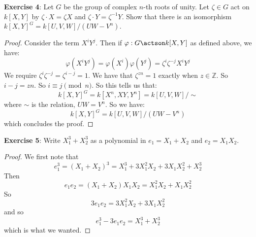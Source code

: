 \documentclass{article}
\begin{document}
\textbf{Exercise 4}: Let $G$ be the group of complex $n$-th roots of unity. Let $\zeta \in G$ act on $k[X, Y]$ by $\zeta \cdot X = \zeta X$ and $\zeta \cdot Y = \zeta^{-1}Y$. Show that there is an isomorphism $k[X, Y]^{G} = k[U, V, W]/(UW - V^{n})$.
    \begin{proof}
        Consider the term $X^{i}Y^{j}$. Then if $\varphi: G \actson k[X, Y]$ as defined above, we have:
            \begin{equation*}
                \varphi(X^{i}Y^{j}) = \varphi(X^{i})\varphi(Y^{j}) = \zeta^{i}\zeta^{-j}X^{i}Y^{j}
            \end{equation*}
        We require $\zeta^{i}\zeta^{-j} = \zeta^{i - j} = 1$. We have that $\zeta^{zn} = 1$ exactly when $z \in \mathbb{Z}$. So $i - j = zn$. So $i \equiv j \pmod{n}$. So this tells us that:
            \begin{equation*}
                k[X, Y]^{G} = k[X^{n}, XY, Y^{n}] = k[U, V, W]/\sim 
            \end{equation*}
        where $\sim $ is the relation, $UW = V^{n}$. So we have:
            \begin{equation*}
                k[X, Y]^{G} = k[U, V, W]/(UW - V^{n})
            \end{equation*}
        which concludes the proof.
    \end{proof}

\textbf{Exercise 5}: Write $X_{1}^{3} + X_{2}^{3}$ as a polynomial in $e_{1} = X_{1} + X_{2}$ and $e_{2} = X_{1}X_{2}$.
    \begin{proof}
        We first note that
            \begin{equation*}
                e_{1}^{3} = (X_{1} + X_{2})^{3} = X_{1}^{3} + 3X_{1}^{2}X_{2} + 3X_{1}X_{2}^{2} + X_{2}^{3}
            \end{equation*}
        Then 
            \begin{equation*}
                e_{1}e_{2} = (X_{1} + X_{2})X_{1}X_{2} = X_{1}^{2}X_{2} + X_{1}X_{2}^{2}
            \end{equation*}
        So
            \begin{equation*}
                3e_{1}e_{2} = 3X_{1}^{2}X_{2} + 3X_{1}X_{2}^{2}
            \end{equation*}
        and so
            \begin{equation*}
                e_{1}^{3} - 3e_{1}e_{2} = X_{1}^{3} + X_{2}^{3}
            \end{equation*}
        which is what we wanted.
    \end{proof}
\end{document}
